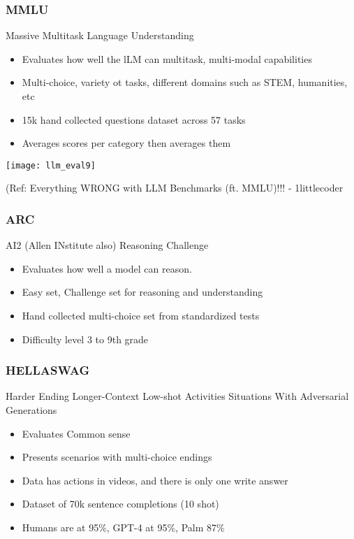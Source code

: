 \begin{frame}[fragile]\frametitle{MMLU}
Massive Multitask Language Understanding

  \begin{itemize}
  \item Evaluates how well the lLM can multitask, multi-modal capabilities
    \item Multi-choice, variety ot tasks, different domains such as STEM, humanities, etc
	\item 15k hand collected questions dataset across 57 tasks
	\item Averages scores per category then averages them
  \end{itemize}
  
\begin{center}
\texttt{[image: llm\_eval9]}
\end{center}		
		
{\tiny (Ref: Everything WRONG with LLM Benchmarks (ft. MMLU)!!! - 1littlecoder}
		
		
\end{frame}

\begin{frame}[fragile]\frametitle{ARC}
AI2 (Allen INstitute also) Reasoning Challenge

  \begin{itemize}
  \item Evaluates how well a model can reason.
    \item Easy set, Challenge set for reasoning and understanding
	\item Hand collected multi-choice set from standardized tests
	\item Difficulty level 3 to 9th grade
  \end{itemize}
\end{frame}

\begin{frame}[fragile]\frametitle{HELLASWAG}
Harder Ending Longer-Context Low-shot Activities Situations With Adversarial Generations

  \begin{itemize}
  \item Evaluates Common sense
    \item Presents scenarios with multi-choice endings
	\item Data has actions in videos, and there is only one write answer
	\item Dataset of 70k sentence completions (10 shot)
	\item Humans are at 95\%, GPT-4 at 95\%, Palm 87\%
  \end{itemize}
\end{frame}

